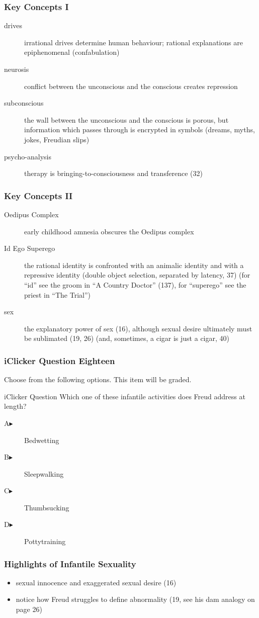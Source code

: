 \documentclass[xcolor=dvipsnames]{beamer}
\begin{document}
\begin{frame}
  \frametitle{Key Concepts I} 
  \begin{description}
  \item[drives] irrational drives determine human behaviour; rational
    explanations are epiphenomenal (confabulation)
  \item[neurosis] conflict between the unconscious and the conscious
    creates repression
  \item[subconscious] the wall between the unconscious and the
    conscious is porous, but information which passes through is
    encrypted in symbols (dreams, myths, jokes, Freudian slips)
  \item[psycho-analysis] therapy is bringing-to-consciousness and
    transference (32)
  \end{description}
\end{frame}

\begin{frame}
  \frametitle{Key Concepts II} 
  \begin{description}
  \item[Oedipus Complex] early childhood amnesia obscures the Oedipus
    complex
  \item[Id Ego Superego] the rational identity is confronted with an
    animalic identity and with a repressive identity (double object
    selection, separated by latency, 37) (for ``id'' see the groom in
    ``A Country Doctor'' (137), for ``superego'' see the priest in ``The
    Trial'')
  \item[sex] the explanatory power of sex (16), although sexual desire
    ultimately must be sublimated (19, 26) (and, sometimes, a cigar is
    just a cigar, 40)
  \end{description}
\end{frame}

\begin{frame}
  \frametitle{iClicker Question Eighteen}
Choose from the following options. This item will be graded.
\begin{block}{iClicker Question}
Which one of these infantile activities does Freud address at length?
\end{block}
\begin{description}
\item[A\hspace{.2in}$\blacktriangleright$] Bedwetting
\item[B\hspace{.2in}$\blacktriangleright$] Sleepwalking
\item[C\hspace{.2in}$\blacktriangleright$] Thumbsucking
\item[D\hspace{.2in}$\blacktriangleright$] Pottytraining
\end{description}
\end{frame}

\begin{frame}
  \frametitle{Highlights of Infantile Sexuality} 
  \begin{itemize}
  \item sexual innocence and exaggerated sexual desire (16)
  \item notice how Freud struggles to define abnormality (19, see his
    dam analogy on page 26)
  \end{itemize}
\end{frame}
\end{document}
